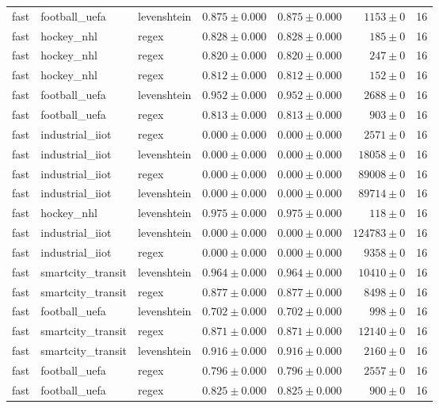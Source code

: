 \begin{table}[htbp]
\begin{tabular}{l l l r r r r}
fast & football\_uefa & levenshtein & $0.875\pm0.000$ & $0.875\pm0.000$ & $1153\pm0$ & 16 \\
fast & hockey\_nhl & regex & $0.828\pm0.000$ & $0.828\pm0.000$ & $185\pm0$ & 16 \\
fast & hockey\_nhl & regex & $0.820\pm0.000$ & $0.820\pm0.000$ & $247\pm0$ & 16 \\
fast & hockey\_nhl & regex & $0.812\pm0.000$ & $0.812\pm0.000$ & $152\pm0$ & 16 \\
fast & football\_uefa & levenshtein & $0.952\pm0.000$ & $0.952\pm0.000$ & $2688\pm0$ & 16 \\
fast & football\_uefa & regex & $0.813\pm0.000$ & $0.813\pm0.000$ & $903\pm0$ & 16 \\
fast & industrial\_iiot & regex & $0.000\pm0.000$ & $0.000\pm0.000$ & $2571\pm0$ & 16 \\
fast & industrial\_iiot & levenshtein & $0.000\pm0.000$ & $0.000\pm0.000$ & $18058\pm0$ & 16 \\
fast & industrial\_iiot & regex & $0.000\pm0.000$ & $0.000\pm0.000$ & $89008\pm0$ & 16 \\
fast & industrial\_iiot & levenshtein & $0.000\pm0.000$ & $0.000\pm0.000$ & $89714\pm0$ & 16 \\
fast & hockey\_nhl & levenshtein & $0.975\pm0.000$ & $0.975\pm0.000$ & $118\pm0$ & 16 \\
fast & industrial\_iiot & levenshtein & $0.000\pm0.000$ & $0.000\pm0.000$ & $124783\pm0$ & 16 \\
fast & industrial\_iiot & regex & $0.000\pm0.000$ & $0.000\pm0.000$ & $9358\pm0$ & 16 \\
fast & smartcity\_transit & levenshtein & $0.964\pm0.000$ & $0.964\pm0.000$ & $10410\pm0$ & 16 \\
fast & smartcity\_transit & regex & $0.877\pm0.000$ & $0.877\pm0.000$ & $8498\pm0$ & 16 \\
fast & football\_uefa & levenshtein & $0.702\pm0.000$ & $0.702\pm0.000$ & $998\pm0$ & 16 \\
fast & smartcity\_transit & regex & $0.871\pm0.000$ & $0.871\pm0.000$ & $12140\pm0$ & 16 \\
fast & smartcity\_transit & levenshtein & $0.916\pm0.000$ & $0.916\pm0.000$ & $2160\pm0$ & 16 \\
fast & football\_uefa & regex & $0.796\pm0.000$ & $0.796\pm0.000$ & $2557\pm0$ & 16 \\
fast & football\_uefa & regex & $0.825\pm0.000$ & $0.825\pm0.000$ & $900\pm0$ & 16 \\

\end{tabular}
\end{table}
